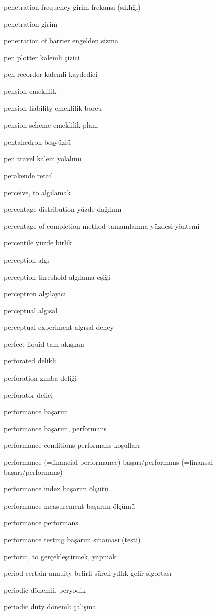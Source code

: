 \documentclass[12pt,fleqn]{article}\usepackage{../../common}
\begin{document}
penetration frequency girim frekansı (sıklığı)

penetration girim

penetration of barrier engelden sizma

pen plotter kalemli çizici

pen recorder kalemli kaydedici

pension emeklilik

pension liability emeklilik borcu

pension scheme emeklilik planı

pentahedron beşyüzlü

pen travel kalem yolalımı

perakende retail

perceive, to algılamak

percentage distribution yüzde dağılımı

percentage of completion method tamamlanma yüzdesi yöntemi

percentile yüzde birlik

perception algı

perception threshold algılama eşiği

perceptron algılayıcı

perceptual algısal

perceptual experiment algısal deney

perfect liquid tam akışkan

perforated delikli

perforation zımba deliği

perforator delici

performance başarım

performance başarım, performans

performance conditions performans koşulları

performance (=financial performance) başarı/performans (=finansal başarı/performans)

performance index başarım ölçütü

performance measurement başarım ölçümü

performance performans

performance testing başarım sınaması (testi)

perform, to gerçekleştirmek, yapmak

period-certain annuity belirli süreli yıllık gelir sigortası

periodic dönemli, peryodik

periodic duty dönemli çalışma
\end{document}
